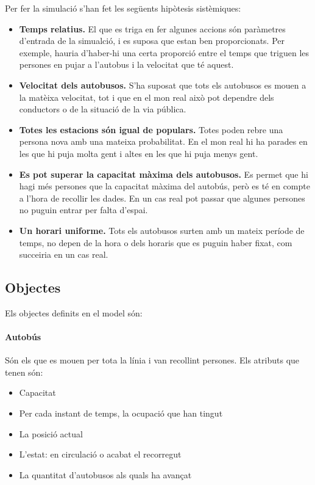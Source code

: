 \documentclass[a4paper,10pt]{article}
\begin{document}
Per fer la simulació s'han fet les següents hipòtesis sistèmiques:
\begin{itemize}
 \item \textbf{Temps relatius. } El que es triga en fer algunes accions són paràmetres d'entrada de la simualció, i es suposa que estan ben proporcionats. Per exemple, hauria d'haber-hi una certa proporció entre el temps que triguen les persones en pujar a l'autobus i la velocitat que té aquest.
 \item \textbf{Velocitat dels autobusos.} S'ha suposat que tots els autobusos es mouen a la matèixa velocitat, tot i que en el mon real això pot dependre dels conductors o de la situació de la via pública.
 \item \textbf{Totes les estacions són igual de populars. } Totes poden rebre una persona nova amb una mateixa probabilitat. En el mon real hi ha parades en les que hi puja molta gent i altes en les que hi puja menys gent.
 \item \textbf{Es pot superar la capacitat màxima dels autobusos. } Es permet que hi hagi més persones que la capacitat màxima del autobús, però es té en compte a l'hora de recollir les dades. En un cas real pot passar que algunes persones no puguin entrar per falta d'espai.
 \item \textbf{Un horari uniforme. } Tots els autobusos surten amb un mateix període de temps, no depen de la hora o dels horaris que es puguin haber fixat, com succeiria en un cas real.
\end{itemize}

\subsection{Objectes}

Els objectes definits en el model són:

\paragraph{Autobús}
Són els que es mouen per tota la línia i van recollint persones. Els atributs que tenen són:
\begin{itemize}
 \item Capacitat
 \item Per cada instant de temps, la ocupació que han tingut
 \item La posició actual
 \item L'estat: en circulació o acabat el recorregut
 \item La quantitat d'autobusos als quals ha avançat
\end{itemize}
\end{document}
